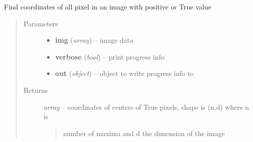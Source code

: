 \documentclass[letterpaper,10pt,english]{sphinxmanual}
\begin{document}

\begin{fulllineitems}
\label{api/ClearMap.ImageProcessing:ClearMap.ImageProcessing.MaximaDetection.findPixelCoordinates}
Find coordinates of all pixel in an image with positive or True value
\begin{quote}\begin{description}
\item[{Parameters}] \leavevmode\begin{itemize}
\item {} 
\textbf{img} (\emph{array}) --
image data

\item {} 
\textbf{verbose} (\emph{bool}) --
print progress info

\item {} 
\textbf{out} (\emph{object}) --
object to write progress info to

\end{itemize}

\item[{Returns}] \leavevmode

\emph{array} --
coordinates of centers of True pixels, shape is (n,d)  where n is
\begin{quote}

number of maxima and d the dimension of the image
\end{quote}


\end{description}\end{quote}

\end{fulllineitems}

\end{document}
